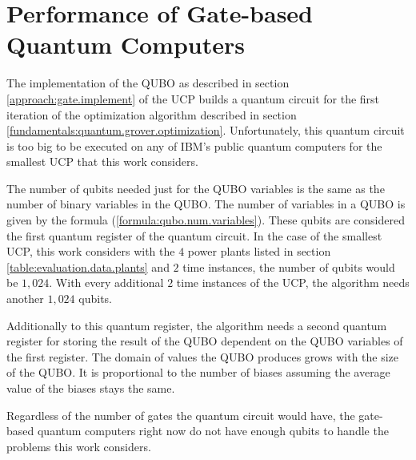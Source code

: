 \section{Performance of Gate-based Quantum Computers}

The implementation of the QUBO as described in section \ref{approach:gate.implement} of the UCP builds a quantum circuit for the first iteration of the optimization algorithm described in section \ref{fundamentals:quantum.grover.optimization}.
Unfortunately, this quantum circuit is too big to be executed on any of IBM's public quantum computers for the smallest UCP that this work considers.

The number of qubits needed just for the QUBO variables is the same as the number of binary variables in the QUBO.
The number of variables in a QUBO is given by the formula (\ref{formula:qubo.num.variables}).
These qubits are considered the first quantum register of the quantum circuit.
In the case of the smallest UCP, this work considers with the $4$ power plants listed in section \ref{table:evaluation.data.plants} and $2$ time instances, the number of qubits would be $1, 024$.
With every additional $2$ time instances of the UCP, the algorithm needs another $1, 024$ qubits.

Additionally to this quantum register, the algorithm needs a second quantum register for storing the result of the QUBO dependent on the QUBO variables of the first register.
The domain of values the QUBO produces grows with the size of the QUBO.
It is proportional to the number of biases assuming the average value of the biases stays the same.

Regardless of the number of gates the quantum circuit would have, the gate-based quantum computers right now do not have enough qubits to handle the problems this work considers.
